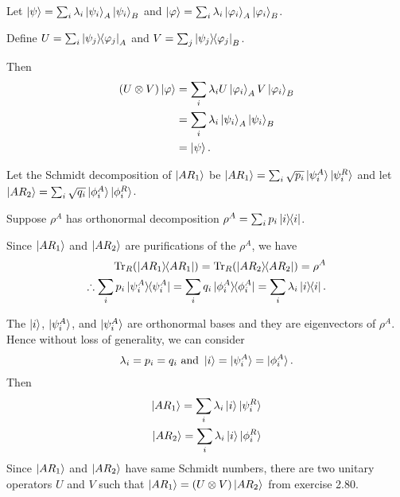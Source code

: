 
Let $\ket{\psi} = \sum_i \lambda_i \ket{\psi_i}_A \ket{\psi_i}_B$ and $\ket{\varphi} = \sum_i \lambda_i \ket{\varphi_i}_A \ket{\varphi_i}_B$.

Define $U = \sum_i \ket{\psi_j}\hspace{-1mm} \bra{\varphi_j}_A$ and $V = \sum_j \ket{\psi_j}\hspace{-1mm} \bra{\varphi_j}_B$.

Then
\begin{align*}
	(U \otimes V) \ket{\varphi} &= \sum_i \lambda_i U \ket{\varphi_i}_A  V \ket{\varphi_i}_B\\
		&= \sum_i \lambda_i \ket{\psi_i}_A \ket{\psi_i}_B\\
		&= \ket{\psi}.
\end{align*}



Let the Schmidt decomposition of $\ket{AR_1}$ be $\ket{AR_1} = \sum_i \sqrt{p_i} \ket{\psi_i^A} \ket{\psi_i^R}$ and
let $\ket{AR_2} = \sum_i \sqrt{q_i} \ket{\phi_i^A} \ket{\phi_i^R}$.

Suppose $\rho^A$ has orthonormal decomposition $\rho^A = \sum_i p_i \ket{i}\hspace{-1mm} \bra{i}$.

Since $\ket{AR_1}$ and $\ket{AR_2}$ are purifications of the $\rho^A$, we have
%
\begin{align*}
    \operatorname{Tr}_R (\ket{AR_1}\hspace{-1mm} \bra{AR_1}) = \operatorname{Tr}_R (\ket{AR_2}\hspace{-1mm} \bra{AR_2}) = \rho^A\\
    \therefore \sum_i p_i \ket{\psi_i^A}\hspace{-1mm} \bra{\psi_i^A} = \sum_i q_i \ket{\phi_i^A}\hspace{-1mm} \bra{\phi_i^A} = \sum_i \lambda_i \ket{i}\hspace{-1mm} \bra{i}.
\end{align*}

The $\ket{i}$, $\ket{\psi_i^A}$, and $\ket{\psi_i^A}$ are orthonormal bases and they are eigenvectors of $\rho^A$.
Hence without loss of generality, we can consider
\begin{align*}
    \lambda_i = p_i = q_i \text{ and } \ket{i} = \ket{\psi_i^A} = \ket{\phi_i^A}.
\end{align*}
%
Then
\begin{align*}
    \ket{AR_1} = \sum_i \lambda_i \ket{i} \ket{\psi_i^R}\\
    \ket{AR_2} = \sum_i \lambda_i \ket{i} \ket{\phi_i^R}
\end{align*}
Since $\ket{AR_1}$ and $\ket{AR_2}$ have same Schmidt numbers, there are two unitary operators $U$ and $V$ such that
$\ket{AR_1} = (U \otimes V) \ket{AR_2}$ from exercise 2.80.

